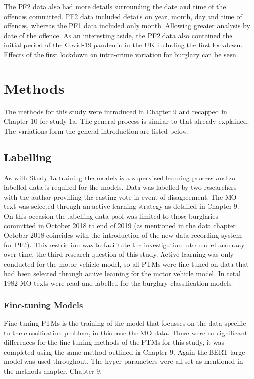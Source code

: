 The PF2 data also had more details surrounding the date and time of the offences committed. PF2 data included details on year, month, day and time of  offences, whereas the PF1 data included only month. Allowing greater analysis by date of the offence. As an interesting aside, the PF2 data also contained the initial period of the Covid-19 pandemic in the UK including the first lockdown. Effects of the first lockdown on intra-crime variation for burglary can be seen.   


\section{Methods} The methods for this study were introduced in Chapter 9 and recapped in Chapter 10 for study 1a. The general process is similar to that already explained. The variations form the general introduction are listed below.

\subsection{Labelling} As with Study 1a training the models is a supervised learning process and so labelled data is required for the models. Data was labelled by two researchers with the author providing the casting vote in event of disagreement. The MO text was selected through an active learning strategy as detailed in Chapter 9. On this occasion the labelling data pool was limited to those burglaries committed in October 2018 to end of 2019 (as mentioned in the data chapter October 2018 coincides with the introduction of the new data recording system for PF2). This restriction was to facilitate the investigation into model accuracy over time, the third research question of this study.  Active learning was only conducted for the motor vehicle model, so all PTMs were fine tuned on data that had been selected through active learning for the motor vehicle model. In total 1982 MO texts were read and  labelled for the burglary classification models.

\subsubsection{Fine-tuning Models} Fine-tuning PTMs is the training of the model that focusses on the data specific to the classification problem, in this case the MO data. There were no significant differences for the fine-tuning methods of the PTMs for this study, it was completed using the same method outlined in Chapter 9. Again the BERT large model was used throughout. The hyper-parameters were all set as mentioned in the methods chapter, Chapter 9. 

